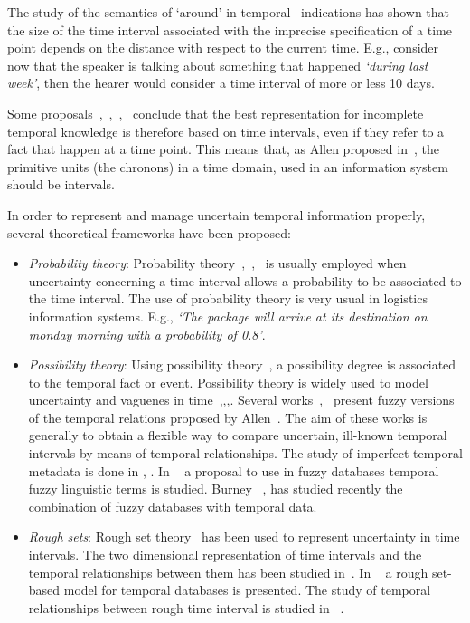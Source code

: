 The study of the semantics of `around' in temporal~\cite{Dev98} indications has shown that the size of the time interval associated with the imprecise specification of a time point depends on the distance with respect to the current time. E.g., consider now that the speaker is talking about something that happened \emph{`during last week'}, then the hearer would consider a time interval of more or less 10 days. 


Some proposals~\cite{knight1993},~\cite{Cru97},~\cite{nagypal2003},~\cite{Chountas2000} conclude that the best representation for incomplete temporal knowledge is therefore based on time intervals, even if they refer to a fact that happen at a time point. This means that, as Allen proposed in~\cite{Allen83}, the primitive units (the chronons) in a time domain, used in an information system should be intervals.

In order to represent and manage uncertain temporal information properly, several theoretical frameworks have been proposed:

\begin{itemize}
\item \emph{Probability theory}:
Probability theory~\cite{Dey1996},~\cite{Lakshmanan1997},~\cite{Haddawy1996} is usually employed when uncertainty concerning a time interval allows a probability to be associated to the time interval. The use of probability theory is very usual in logistics information systems. E.g., \emph{`The package will arrive at its destination on monday morning with a probability of 0.8'}.



\item \emph{Possibility theory}:
Using possibility theory~\cite{DidierDubois1988a}, a possibility degree is associated to the temporal fact or event. Possibility theory is widely used to model uncertainty and vaguenes in time~\cite{Dubois:jucs_9_9:fuzziness_and_uncertainty_in},\cite{Dubois89},\cite{devos94},\cite{nagypal2003}. Several works~\cite{schockaert08},~\cite{ohlbach2004} present fuzzy versions of the temporal relations proposed by Allen~\cite{Allen83}. The aim of these works is generally to obtain a flexible way to compare uncertain, ill-known temporal intervals by means of temporal relationships. The study of imperfect temporal metadata is done in \cite{Bordogna2009}, \cite{Bordogna2011}. In ~\cite{Soysangwarn2009} a proposal to use in fuzzy databases temporal fuzzy linguistic terms is studied. Burney ~\cite{burney2010a}, \cite{burney2010b} has studied recently the combination of fuzzy databases with temporal data.


\item \emph{Rough sets}:
Rough set theory~\cite{Pawlak1995} has been used to represent uncertainty in time intervals. The two dimensional representation of time intervals and the temporal relationships between them has been studied in~\cite{Qia09}. In ~\cite{Burney2009} a rough set-based model for temporal databases is presented. The study of temporal relationships between rough time interval is studied in ~\cite{Bassiri2009}.
\end{itemize}



